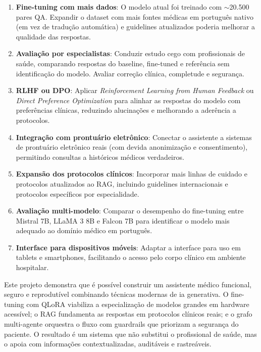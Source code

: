 \begin{enumerate}
    \item \textbf{Fine-tuning com mais dados}: O modelo atual foi treinado com $\sim$20.500 pares QA. Expandir o dataset com mais fontes médicas em português nativo (em vez de tradução automática) e guidelines atualizados poderia melhorar a qualidade das respostas.

    \item \textbf{Avaliação por especialistas}: Conduzir estudo cego com profissionais de saúde, comparando respostas do baseline, fine-tuned e referência sem identificação do modelo. Avaliar correção clínica, completude e segurança.

    \item \textbf{RLHF ou DPO}: Aplicar \textit{Reinforcement Learning from Human Feedback} ou \textit{Direct Preference Optimization} para alinhar as respostas do modelo com preferências clínicas, reduzindo alucinações e melhorando a aderência a protocolos.

    \item \textbf{Integração com prontuário eletrônico}: Conectar o assistente a sistemas de prontuário eletrônico reais (com devida anonimização e consentimento), permitindo consultas a históricos médicos verdadeiros.

    \item \textbf{Expansão dos protocolos clínicos}: Incorporar mais linhas de cuidado e protocolos atualizados ao RAG, incluindo guidelines internacionais e protocolos específicos por especialidade.

    \item \textbf{Avaliação multi-modelo}: Comparar o desempenho do fine-tuning entre Mistral 7B, LLaMA 3 8B e Falcon 7B para identificar o modelo mais adequado ao domínio médico em português.

    \item \textbf{Interface para dispositivos móveis}: Adaptar a interface para uso em tablets e smartphones, facilitando o acesso pelo corpo clínico em ambiente hospitalar.
\end{enumerate}


\begin{infobox}
Este projeto demonstra que é possível construir um assistente médico funcional, seguro e reprodutível combinando técnicas modernas de \acrshort{ia} generativa. O fine-tuning com QLoRA viabiliza a especialização de modelos grandes em hardware acessível; o RAG fundamenta as respostas em protocolos clínicos reais; e o grafo multi-agente orquestra o fluxo com guardrails que priorizam a segurança do paciente. O resultado é um sistema que não substitui o profissional de saúde, mas o apoia com informações contextualizadas, auditáveis e rastreáveis.
\end{infobox}
